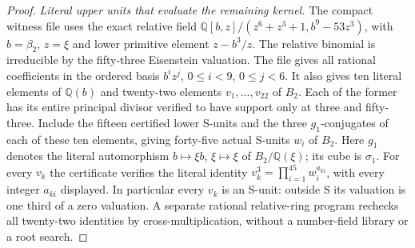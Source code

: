 \begin{proof}
\emph{Literal upper units that evaluate the remaining kernel.}
The compact witness file uses the exact relative field
$\mathbb Q[b,z]/(z^6+z^3+1,b^9-53z^3)$, with
$b=\beta_2$, $z=\xi$ and lower primitive element
$z-b^3/z$. The relative binomial is irreducible by the
fifty-three Eisenstein valuation. The file gives all rational
coefficients in the ordered basis $b^iz^j$, $0\le i<9$, $0\le j<6$.
It also gives ten literal elements of $\mathbb Q(b)$ and twenty-two
elements $v_1,\ldots,v_{22}$ of $B_2$. Each of the former has its
entire principal divisor verified to have support only at three
and fifty-three. Include the fifteen certified lower S-units and
the three $g_1$-conjugates of each of these ten elements, giving
forty-five actual S-units $w_i$ of $B_2$. Here $g_1$ denotes the
literal automorphism $b\mapsto\xi b$, $\xi\mapsto\xi$ of
$B_2/\mathbb Q(\xi)$; its cube is $\sigma_1$.
For every $v_k$ the certificate verifies the literal identity
$v_k^3=\prod_{i=1}^{45}w_i^{a_{ki}}$, with every integer $a_{ki}$
displayed. In particular every $v_k$ is an S-unit: outside S its
valuation is one third of a zero valuation. A separate rational
relative-ring program rechecks all twenty-two identities by
cross-multiplication, without a number-field library or a root search.


\end{proof}
